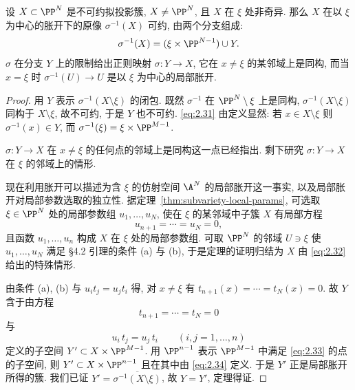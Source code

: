 \begin{theorem}\label{thm:blowup-subvariety}
	设 $X \subset \PP^N$ 是不可约拟投影簇, $X \ne \PP^N$, 且 $X$ 在 $\xi$ 处非奇异. 那么 $X$ 在以 $\xi$ 为中心的胀开下的原像 $\sigma^{-1}(X)$ 可约, 由两个分支组成:
	\begin{equation}
		\label{eq:2.31}
		\sigma^{-1}(X) = (\xi \times \PP^{N-1}) \cup Y.
	\end{equation}
	$\sigma$ 在分支 $Y$ 上的限制给出正则映射 $\sigma: Y \to X$, 它在 $x \ne \xi$ 的某邻域上是同构, 而当 $x = \xi$ 时 $\sigma^{-1}(U) \to U$ 是以 $\xi$ 为中心的局部胀开.
\end{theorem}

\begin{proof}
	用 $Y$ 表示 $\sigma^{-1}(X \setminus \xi)$ 的闭包. 既然 $\sigma^{-1}$ 在 $\PP^N \setminus \xi$ 上是同构, $\sigma^{-1}(X \setminus \xi)$ 同构于 $X \setminus \xi$, 故不可约, 于是 $Y$ 也不可约. \eqref{eq:2.31} 由定义显然: 若 $x \in X \setminus \xi$ 则 $\sigma^{-1}(x) \in Y$, 而 $\sigma^{-1}(\xi) = \xi \times \PP^{M-1}$.

	$\sigma: Y \to X$ 在 $x \ne \xi$ 的任何点的邻域上是同构这一点已经指出. 剩下研究 $\sigma: Y \to X$ 在 $\xi$ 的邻域上的情形.

	现在利用胀开可以描述为含 $\xi$ 的仿射空间 $\A^N$ 的局部胀开这一事实, 以及局部胀开对局部参数选取的独立性. 据定理~\ref{thm:subvariety-local-params}, 可选取 $\xi \in \PP^N$ 处的局部参数组 $u_1, \ldots, u_N$, 使在 $\xi$ 的某邻域中子簇 $X$ 有局部方程
	\begin{equation}
		\label{eq:2.32}
		u_{n+1} = \cdots = u_N = 0,
	\end{equation}
	且函数 $u_1, \ldots, u_n$ 构成 $X$ 在 $\xi$ 处的局部参数组. 可取 $\PP^N$ 的邻域 $U \ni \xi$ 使 $u_1, \ldots, u_N$ 满足 §4.2 引理的条件 (a) 与 (b), 于是定理的证明归结为 $X$ 由 \eqref{eq:2.32} 给出的特殊情形.

	由条件 (a), (b) 与 $u_i t_j = u_j t_i$ 得, 对 $x \ne \xi$ 有 $t_{n+1}(x) = \cdots = t_N(x) = 0$. 故 $Y$ 含于由方程
	\begin{equation}
		\label{eq:2.33}
		t_{n+1} = \cdots = t_N = 0
	\end{equation}
	与
	\begin{equation}
		\label{eq:2.34}
		u_i\, t_j = u_j\, t_i \qquad (i, j = 1, \ldots, n)
	\end{equation}
	定义的子空间 $Y' \subset X \times \PP^{M-1}$. 用 $\PP^{n-1}$ 表示 $\PP^{M-1}$ 中满足 \eqref{eq:2.33} 的点的子空间, 则 $Y' \subset X \times \PP^{n-1}$ 且在其中由 \eqref{eq:2.34} 定义. 于是 $Y'$ 正是局部胀开所得的簇. 我们已证 $Y' = \overline{\sigma^{-1}(X \setminus \xi)}$, 故 $Y = Y'$, 定理得证.
\end{proof}

